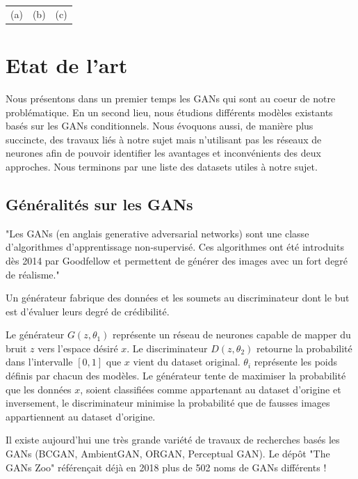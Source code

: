 \documentclass[a4paper, 12pt]{report}
\begin{document}
\begin{center}
\begin{tabular}{ccc}
    (a)&(b)&(c)
  \end{tabular}
\end{center}



\chapter{Etat de l'art}
 
Nous présentons dans un premier temps les GANs qui sont au coeur de notre problématique. En un second lieu, nous étudions différents modèles existants basés sur les GANs conditionnels. Nous évoquons aussi, de manière plus succincte, des travaux liés à notre sujet mais n'utilisant pas les réseaux de neurones afin de pouvoir identifier les avantages et inconvénients des deux approches. Nous terminons par une liste des datasets utiles à notre sujet.


\section{Généralités sur les GANs}

"Les GANs (en anglais generative adversarial networks) sont une classe d'algorithmes d'apprentissage non-supervisé. Ces algorithmes ont été introduits dès 2014 par Goodfellow et permettent de générer des images avec un fort degré de réalisme." \cite{wiki:Reseaux-antagonistes-generatifs}

Un générateur fabrique des données et les soumets au discriminateur dont le but est d'évaluer leurs degré de crédibilité. 

Le générateur $G(z, \theta_{1})$ représente un réseau de neurones capable de mapper du bruit $z$ vers l'espace désiré $x$. Le discriminateur $D(z, \theta_{2})$ retourne la probabilité dans l'intervalle $[0,1]$ que $x$ vient du dataset original. $\theta_{i}$ représente les poids définis par chacun des modèles. Le générateur tente de maximiser la probabilité que les données $x$, soient classifiées comme appartenant au dataset d'origine et inversement, le discriminateur minimise la probabilité que de fausses images appartiennent au dataset d'origine.

Il existe aujourd'hui une très grande variété de travaux de recherches basés les GANs (BCGAN, AmbientGAN, ORGAN, Perceptual GAN). Le dépôt "The GANs Zoo" \cite{hindupuravinash} référençait déjà en 2018 plus de 502 noms de GANs différents !
\end{document}
